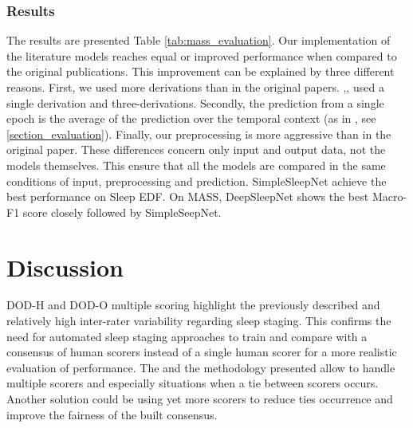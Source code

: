 \documentclass[journal]{IEEEtran}
\begin{document}
\subsubsection{Results} The results are presented Table \ref{tab:mass_evaluation}. Our implementation of the literature models reaches equal or improved performance when compared to the original publications. This improvement can be explained by three different reasons. First, we used more derivations than in the original papers. \cite{Tsinalis2016a},\cite{Tsinalis2016},\cite{Supratak2017} used a single derivation and \cite{Phan2019} three-derivations. Secondly, the prediction from a single epoch is the average of the prediction over the temporal context (as in \cite{Phan2019}, see \ref{section_evaluation}). Finally, our preprocessing is more aggressive than in the original paper. These differences concern only input and output data, not the models themselves. This ensure that all the models are compared in the same conditions of input, preprocessing and prediction.
SimpleSleepNet achieve the best performance on Sleep EDF. On MASS, DeepSleepNet shows the best Macro-F1 score closely followed by SimpleSeepNet.
 
\section{Discussion}

DOD-H and DOD-O multiple scoring highlight the previously described and relatively high inter-rater variability regarding sleep staging. This confirms the need for automated sleep staging approaches to train and compare with a consensus of human scorers instead of a single human scorer for a more realistic evaluation of performance. The  and the methodology presented allow to handle multiple scorers and especially situations when a tie between scorers occurs. Another solution could be using yet more scorers to reduce ties occurrence and improve the fairness of the built consensus.
\end{document}

